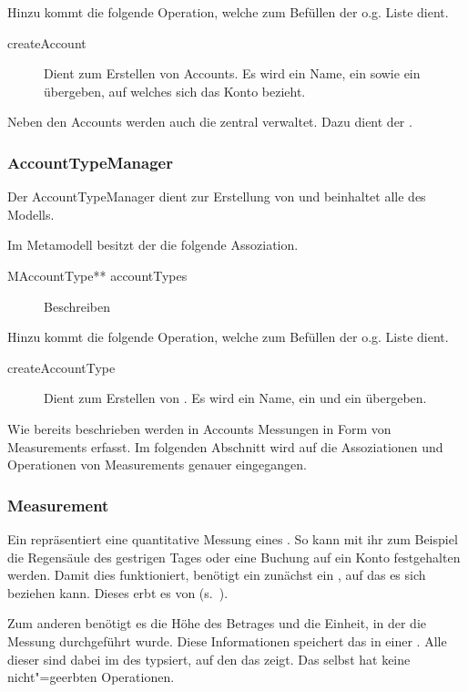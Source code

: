 Hinzu kommt die folgende Operation, welche zum Befüllen der o.g. Liste dient.
\begin{description}
	\item[createAccount] Dient zum Erstellen von Accounts. Es wird ein Name, ein  sowie ein  übergeben, auf welches sich das Konto bezieht.
\end{description}

Neben den Accounts werden auch die  zentral verwaltet. Dazu dient der .


\subsubsection{AccountTypeManager}
Der AccountTypeManager dient zur Erstellung von  und beinhaltet alle  des Modells.

Im Metamodell besitzt der  die folgende Assoziation.
\begin{description}
	\item[MAccountType** accountTypes] Beschreiben
\end{description}

Hinzu kommt die folgende Operation, welche zum Befüllen der o.g. Liste dient.
\begin{description}
	\item[createAccountType] Dient zum Erstellen von . 
	Es wird ein Name, ein  und ein  übergeben.
\end{description}

Wie bereits beschrieben werden in Accounts Messungen in Form von Measurements erfasst. 
Im folgenden Abschnitt wird auf die Assoziationen und Operationen von Measurements genauer eingegangen.


\subsubsection{Measurement}
Ein  repräsentiert eine quantitative Messung eines . So kann mit ihr zum Beispiel die Regensäule des gestrigen Tages
oder eine Buchung auf ein Konto festgehalten werden. Damit dies funktioniert, benötigt ein  zunächst ein , auf das es
sich beziehen kann. Dieses erbt es von  (s.~).

Zum anderen benötigt es die Höhe des Betrages und die Einheit, in der die Messung durchgeführt wurde. Diese Informationen speichert das 
in einer . Alle  dieser  sind dabei im  des  typsiert,
auf den das  zeigt. Das  selbst hat keine nicht"=geerbten Operationen.


